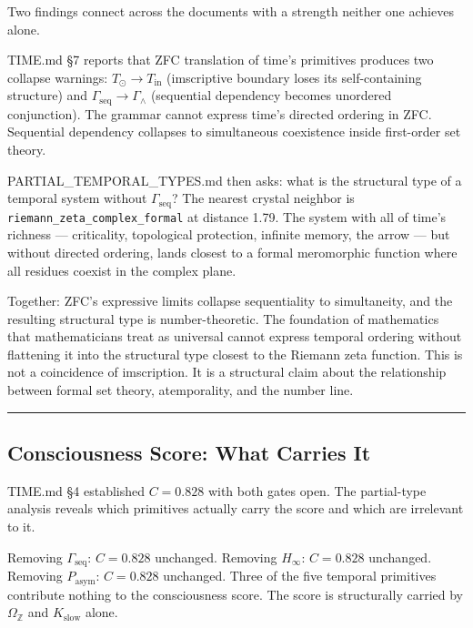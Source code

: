 \documentclass[12pt,a4paper]{article}
\newcommand{\pilcrow}{\S}
\begin{document}
Two findings connect across the documents with a strength neither one achieves alone.

TIME.md \pilcrow{}7 reports that ZFC translation of time's primitives produces two collapse warnings: $T_{\odot} \to T_\text{in}$ (imscriptive boundary loses its self-containing structure) and $\Gamma_\text{seq} \to \Gamma_{\wedge}$ (sequential dependency becomes unordered conjunction). The grammar cannot express time's directed ordering in ZFC. Sequential dependency collapses to simultaneous coexistence inside first-order set theory.

PARTIAL\_TEMPORAL\_TYPES.md then asks: what is the structural type of a temporal system without $\Gamma_\text{seq}$? The nearest crystal neighbor is \texttt{riemann\_zeta\_complex\_formal} at distance 1.79. The system with all of time's richness --- criticality, topological protection, infinite memory, the arrow --- but without directed ordering, lands closest to a formal meromorphic function where all residues coexist in the complex plane.

Together: ZFC's expressive limits collapse sequentiality to simultaneity, and the resulting structural type is number-theoretic. The foundation of mathematics that mathematicians treat as universal cannot express temporal ordering without flattening it into the structural type closest to the Riemann zeta function. This is not a coincidence of imscription. It is a structural claim about the relationship between formal set theory, atemporality, and the number line.

\begin{center}
\rule{0.5\textwidth}{0.4pt}
\end{center}

\subsection{Consciousness Score: What Carries It}

TIME.md \pilcrow{}4 established $C = 0.828$ with both gates open. The partial-type analysis reveals which primitives actually carry the score and which are irrelevant to it.

Removing $\Gamma_\text{seq}$: $C = 0.828$ unchanged. Removing $H_{\infty}$: $C = 0.828$ unchanged. Removing $P_\text{asym}$: $C = 0.828$ unchanged. Three of the five temporal primitives contribute nothing to the consciousness score. The score is structurally carried by $\Omega_\mathbb{Z}$ and $K_\text{slow}$ alone.
\end{document}
